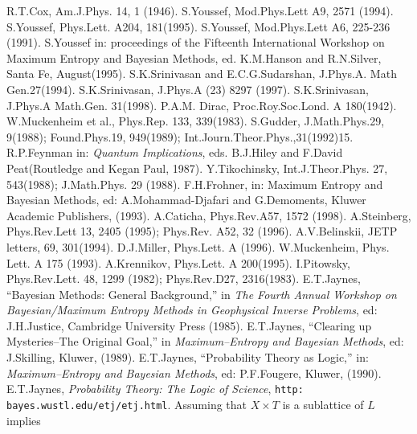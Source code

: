 \documentclass[11pt]{article}
\begin{document}
\begin{thebibliography}{10}
 R.T.Cox, Am.J.Phys. 14, 1 (1946).
 S.Youssef, Mod.Phys.Lett A9, 2571 (1994).
 S.Youssef, Phys.Lett. A204, 181(1995).
 S.Youssef, Mod.Phys.Lett A6, 225-236 (1991).
 S.Youssef in: proceedings of the Fifteenth International Workshop 
on Maximum Entropy and Bayesian Methods, ed. K.M.Hanson and R.N.Silver, Santa Fe, 
August(1995).
 S.K.Srinivasan and E.C.G.Sudarshan, J.Phys.A. Math Gen.27(1994).
 S.K.Srinivasan, J.Phys.A (23) 8297 (1997).
 S.K.Srinivasan, J.Phys.A Math.Gen. 31(1998).
 P.A.M. Dirac, Proc.Roy.Soc.Lond. A 180(1942).
 W.Muckenheim et al., Phys.Rep. 133, 339(1983).
 S.Gudder, J.Math.Phys.29, 9(1988); Found.Phys.19, 949(1989); 
Int.Journ.Theor.Phys.,31(1992)15.
 R.P.Feynman in: {\it Quantum Implications}, eds. B.J.Hiley and
F.David Peat(Routledge and Kegan Paul, 1987).
 Y.Tikochinsky, Int.J.Theor.Phys. 27, 543(1988); J.Math.Phys. 29 (1988).
 F.H.Frohner, in: Maximum Entropy and Bayesian Methods, ed:
A.Mohammad-Djafari and G.Demoments, Kluwer Academic Publishers, (1993).
 A.Caticha, Phys.Rev.A57, 1572 (1998).
 A.Steinberg, Phys.Rev.Lett 13, 2405 (1995); Phys.Rev. A52, 32 (1996).
 A.V.Belinskii, JETP letters, 69, 301(1994).
 D.J.Miller, Phys.Lett. A (1996).
 W.Muckenheim, Phys. Lett. A 175 (1993).
 A.Krennikov, Phys.Lett. A 200(1995).
 I.Pitowsky, Phys.Rev.Lett. 48, 1299 (1982); Phys.Rev.D27, 2316(1983).
 E.T.Jaynes, ``Bayesian Methods: General Background,'' in 
{\it The Fourth Annual Workshop on Bayesian/Maximum Entropy Methods in Geophysical
Inverse Problems}, ed: J.H.Justice, Cambridge University Press (1985).
 E.T.Jaynes, ``Clearing up Mysteries--The Original Goal,'' in
{\it Maximum--Entropy and Bayesian Methods}, ed: J.Skilling, Kluwer, (1989).
 E.T.Jaynes, ``Probability Theory as Logic,'' in: 
{\it Maximum--Entropy and Bayesian Methods}, ed: P.F.Fougere, Kluwer, (1990).
 E.T.Jaynes, {\it Probability Theory: The Logic of Science}, 
{\tt http:\\bayes.wustl.edu/etj/etj.html}.
 Assuming that $X\times T$ is a sublattice of $L$ implies 

\end{thebibliography}
\end{document}
